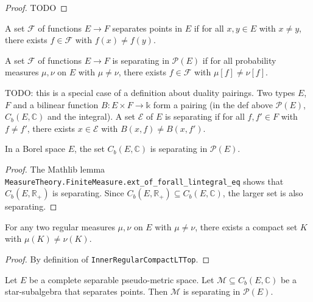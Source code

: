 \begin{proof}
TODO
\end{proof}

\begin{definition}\label{def:separates_points}
 \leanok
A set $\mathcal F$ of functions $E \to F$ separates points in $E$ if for all $x, y \in E$ with $x \ne y$, there exists $f \in \mathcal F$ with $f(x) \ne f(y)$.
\end{definition}

\begin{definition}\label{def:separating}
A set $\mathcal F$ of functions $E \to F$ is separating in $\mathcal P(E)$ if for all probability measures $\mu, \nu$ on $E$ with $\mu \ne \nu$, there exists $f \in \mathcal F$ with $\mu[f] \ne \nu[f]$.
\end{definition}

TODO: this is a special case of a definition about duality pairings. Two types $E$, $F$ and a bilinear function $B : E \times F \to \mathbb{k}$ form a pairing (in the def above $\mathcal P(E)$, $C_b(E, \mathbb{C})$ and the integral). A set $\mathcal E$ of $E$ is separating if for all $f, f' \in F$ with $f \ne f'$, there exists $x \in \mathcal E$ with $B(x, f) \ne B(x, f')$. 

\begin{lemma}\label{lem:bounded_continuous_separating}
In a Borel space $E$, the set $C_b(E, \mathbb{C})$ is separating in $\mathcal P(E)$.
\end{lemma}

\begin{proof}
The Mathlib lemma \texttt{MeasureTheory.FiniteMeasure.ext\_of\_forall\_lintegral\_eq} shows that $C_b(E, \mathbb{R}_+)$ is separating. Since $C_b(E, \mathbb{R}_{+}) \subseteq C_b(E, \mathbb{C})$, the larger set is also separating.
\end{proof}

\begin{lemma}\label{lem:innerRegular_ne_iff_compact}
For any two regular measures $\mu, \nu$ on $E$ with $\mu \ne \nu$, there exists a compact set $K$ with $\mu(K) \ne \nu(K)$.
\end{lemma}

\begin{proof}
By definition of \texttt{InnerRegularCompactLTTop}.
\end{proof}

\begin{theorem}\label{thm:separating_starSubalgebra}
Let $E$ be a complete separable pseudo-metric space. Let $\mathcal M \subseteq C_b(E, \mathbb{C})$ be a star-subalgebra that separates points. Then $\mathcal M$ is separating in $\mathcal P(E)$.
\end{theorem}

